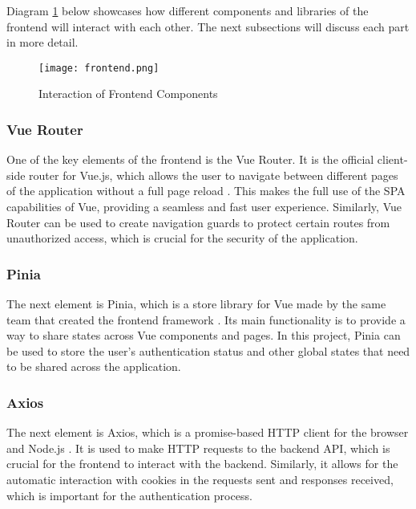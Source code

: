 Diagram \ref{fig:frontend} below showcases how different components and libraries of the frontend will interact with each other. The next subsections will discuss each part in more detail.

\begin{figure}[htbp]
    \centering
    \texttt{[image: frontend.png]}
    \caption{Interaction of Frontend Components}
    \label{fig:frontend}
\end{figure}

\FloatBarrier
\subsubsection{Vue Router}

One of the key elements of the frontend is the Vue Router. It is the official client-side router for Vue.js, which allows the user to navigate between different pages of the application without a full page reload \parencite{vuerouter}. This makes the full use of the SPA capabilities of Vue, providing a seamless and fast user experience. Similarly, Vue Router can be used to create navigation guards to protect certain routes from unauthorized access, which is crucial for the security of the application.

\subsubsection{Pinia}

The next element is Pinia, which is a store library for Vue made by the same team that created the frontend framework \parencite{pinia}. Its main functionality is to provide a way to share states across Vue components and pages. In this project, Pinia can be used to store the user's authentication status and other global states that need to be shared across the application.

\subsubsection{Axios}

The next element is Axios, which is a promise-based HTTP client for the browser and Node.js \parencite{axios}. It is used to make HTTP requests to the backend API, which is crucial for the frontend to interact with the backend. Similarly, it allows for the automatic interaction with cookies in the requests sent and responses received, which is important for the authentication process.

